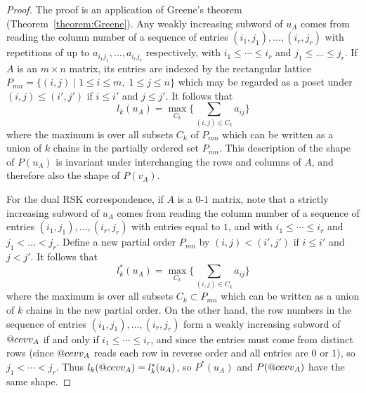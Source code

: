 \documentclass[11pt]{amsproc}
\makeatletter
\DeclareRobustCommand{\cev}[1]{%
  \mathpalette\do@cev{#1}%
}
\newcommand{\do@cev}[2]{%
  \fix@cev{#1}{+}%
  \reflectbox{$\m@th#1\vec{\reflectbox{$\fix@cev{#1}{-}\m@th#1#2\fix@cev{#1}{+}$}}$}%
  \fix@cev{#1}{-}%
}
\newcommand{\fix@cev}[2]{%
  \ifx#1\displaystyle
    \mkern#23mu
  \else
    \ifx#1\textstyle
      \mkern#23mu
    \else
      \ifx#1\scriptstyle
        \mkern#22mu
      \else
        \mkern#22mu
      \fi
    \fi
  \fi
}
\theoremstyle{definition}
\theoremstyle{example}
\makeatother
\begin{document}
\begin{proof}
  The proof is an application of Greene's theorem (Theorem~\ref{theorem:Greene}).
  Any weakly increasing subword of $u_A$ comes from reading the column number of a sequence of entries $(i_1,j_1),\dotsc,(i_r,j_r)$ with repetitions of up to $a_{i_1j_1},\dotsc, a_{i_rj_r}$ respectively, with $i_1\leq \dotsb \leq i_r$ and $j_1\leq \dotsc\leq j_r$.
  If $A$ is an $m\times n$ matrix, its entries are indexed by the rectangular lattice $P_{mn} = \{(i,j)\mid 1\leq i\leq m,\;1\leq j\leq n\}$ which may be regarded as a poset under $(i,j)\leq (i',j')$ if $i\leq i'$ and $j\leq j'$.
  It follows that
  \begin{displaymath}
    l_k(u_A) = \max_{C_k} \Big\{\sum_{(i,j)\in C_k} a_{ij}\Big\}
  \end{displaymath}
  where the maximum is over all subsets $C_k$ of $P_{mn}$ which can be written as a union of $k$ chains in the partially ordered set $P_{mn}$.
  This description of the shape of $P(u_A)$ is invariant under interchanging the rows and columns of $A$, and therefore also the shape of $P(v_A)$.

  For the dual RSK correspondence, if $A$ is a $0$-$1$ matrix, note that a strictly increasing subword of $u_A$ comes from reading the column number of a sequence of entries $(i_1,j_1),\dotsc,(i_r,j_r)$ with entries equal to $1$, and with $i_1\leq \dotsb \leq i_r$ and $j_1<\dotsc<j_r$.
  Define a new partial order $P_{mn}$ by $(i,j)<(i',j')$ if $i\leq i'$ and $j<j'$.
  It follows that
  \begin{displaymath}
    l_k^*(u_A) = \max_{C_k} \Big\{\sum_{(i,j)\in C_k} a_{ij}\Big\}
  \end{displaymath}
  where the maximum is over all subsets $C_k\subset P_{mn}$ which can be written as a union of $k$ chains in the new partial order.
  On the other hand, the row numbers in the sequence of entries $(i_1,j_1),\dotsc,(i_r,j_r)$ form a weakly increasing subword of $\cev v_A$ if and only if $i_1\leq \dotsb \leq i_r$, and since the entries must come from distinct rows (since $\cev v_A$ reads each row in reverse order and all entries are $0$ or $1$), so $j_1<\dotsb < j_r$.
  Thus $l_k(\cev v_A)=l_k^*(u_A)$, so $P^*(u_A)$ and $P(\cev v_A)$ have the same shape.
\end{proof}
\end{document}
